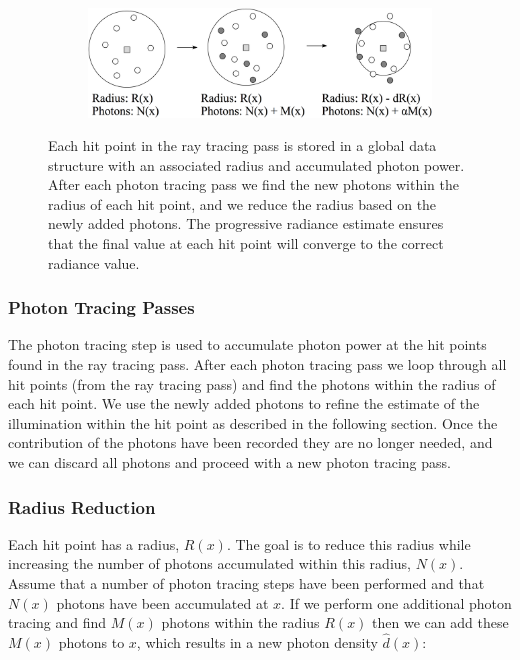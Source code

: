 \begin{figure}\label{f:radius-reduction}
\begin{center}
	\begin{subfigure}[b]{0.8\textwidth}
		\includegraphics[width=1.0\textwidth]{graphics/pm/pm-19}
	\end{subfigure}
\end{center}
\caption{Each hit point in the ray tracing pass is stored in a global data structure with an associated radius and accumulated photon power. After each photon tracing pass we find the new photons within the radius of each hit point, and we reduce the radius based on the newly added photons. The progressive radiance estimate ensures that the final value at each hit point will converge to the correct radiance value.}
\end{figure}



\subsubsection{Photon Tracing Passes}
The photon tracing step is used to accumulate photon power at the hit points found in the ray tracing pass. After each photon tracing pass we loop through all hit points (from the ray tracing pass) and find the photons within the radius of each hit point. We use the newly added photons to refine the estimate of the illumination within the hit point as described in the following section. Once the contribution of the photons have been recorded they are no longer needed, and we can discard all photons and proceed with a new photon tracing pass. 



\subsubsection{Radius Reduction}
Each hit point has a radius, $R(x)$. The goal is to reduce this radius while increasing the number of photons accumulated within this radius, $N(x)$. Assume that a number of photon tracing steps have been performed and that $N(x)$ photons have been accumulated at $x$. If we perform one additional photon tracing and find $M(x)$ photons within the radius $R(x)$ then we can add these $M(x)$ photons to $x$, which results in a new photon density $\hat{d}(x)$:

